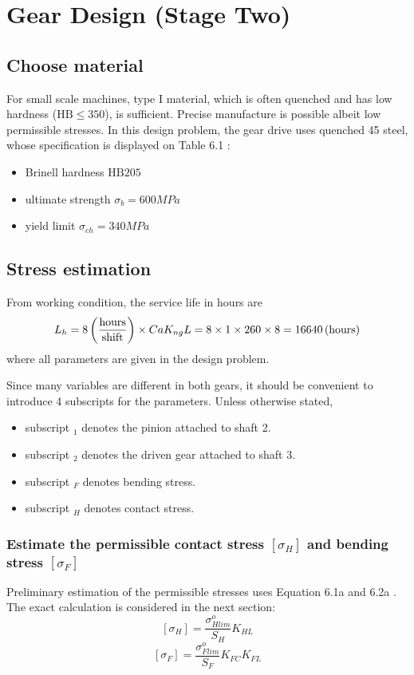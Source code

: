 \chapter{Gear Design (Stage Two)}

\section{Choose material}
For small scale machines, type I material, which is often quenched and has low hardness ($ \text{HB}\leq 350 $), is sufficient. Precise manufacture is possible albeit low permissible stresses. In this design problem, the gear drive uses quenched 45 steel, whose specification is displayed on Table 6.1 \cite{tk1}:
\begin{itemize}
	\item Brinell hardness $ \text{HB} 205 $
	\item ultimate strength $ \sigma_b = 600\unit{MPa} $
	\item yield limit $ \sigma_{ch} = 340 \unit{MPa}$
\end{itemize}

\section{Stress estimation}
From working condition, the service life in hours are
\[L_h = 8\, \mathrm{\left( \dfrac{hours}{shift}\right)}\times Ca  K_{ng} L= 8 \times 1\times 260\times 8 = 16640\, (\mathrm{hours})\]
where all parameters are given in the design problem.

Since many variables are different in both gears, it should be convenient to introduce 4 subscripts for the parameters. Unless otherwise stated,
\begin{itemize}
	\item subscript $ _1 $ denotes the pinion attached to shaft 2.
	\item subscript $ _2 $ denotes the driven gear attached to shaft 3.
	\item subscript $ _F $ denotes bending stress.
	\item subscript $ _H $ denotes contact stress.
\end{itemize}
\subsection{Estimate the permissible contact stress $ [\sigma_H] $ and bending stress $ [\sigma_F] $}
Preliminary estimation of the permissible stresses uses Equation 6.1a and 6.2a \cite{tk1}. The exact calculation is considered in the next section:
\[[\sigma_H]=\dfrac{\sigma_{Hlim}^o}{S_H}K_{HL}\]
\[[\sigma_F]=\dfrac{\sigma_{Flim}^o}{S_F}K_{FC}K_{FL}\]

